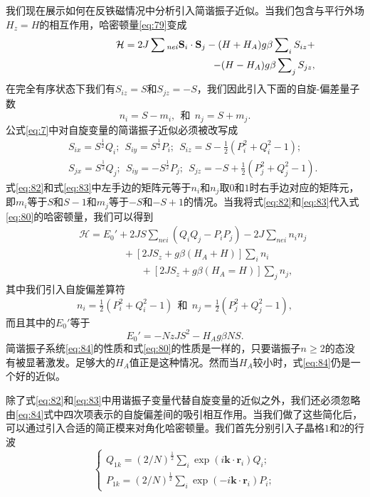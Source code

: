 \documentclass{article}
\begin{document}
我们现在展示如何在反铁磁情况中分析引入简谐振子近似。当我们包含与平行外场$H_z=H$的相互作用，哈密顿量\eqref{eq:79}变成
\begin{eqnarray} \label{eq:80}
&&\mathcal{H}=2J\sum\nolinebreak_{\mathit{nei}}\mathbf{S}_i\cdot\mathbf{S}_j-(H+H_A)g\beta\sum\nolimits_iS_{iz}+\nonumber\\
&&~~~~~~~~~~~~~~~~~~~~~~~~~~~~~~~~~~~~~~~~~~~~~-(H-H_A)g\beta\sum\nolimits_jS_{jz},
\end{eqnarray}
在完全有序状态下我们有$S_{iz}=S$和$S_{jz}=-S$，我们因此引入下面的自旋-偏差量子数
\begin{equation} \label{eq:81}
n_i=S-m_i,~~\text{和}~~n_j=S+m_j.
\end{equation} 
公式\eqref{eq:7}中对自旋变量的简谐振子近似必须被改写成
\begin{eqnarray} 
&&S_{ix}=S^{\frac{1}{2}}Q_i;~~S_{iy}=S^{\frac{1}{2}}P_i;~~S_{iz}=S-\tfrac{1}{2}(P_i^2+Q_i^2-1);\label{eq:82}\\
&&S_{jx}=S^{\frac{1}{2}}Q_j;~~S_{iy}=-S^{\frac{1}{2}}P_j;~~S_{jz}=-S+\tfrac{1}{2}(P_j^2+Q_j^2-1).\label{eq:83}
\end{eqnarray} 
式\eqref{eq:82}和式\eqref{eq:83}中左手边的矩阵元等于$n_i$和$n_j$取$0$和$1$时右手边对应的矩阵元，即$m_i$等于$S$和$S-1$和$m_j$等于$-S$和$-S+1$的情况。当我将式\eqref{eq:82}和\eqref{eq:83}代入式\eqref{eq:80}的哈密顿量，我们可以得到
\begin{eqnarray} \label{eq:84}
&&\mathcal{H}=E_0'+2JS\sum\nolimits_{\mathit{nei}}(Q_iQ_j-P_iP_j)-2J\sum\nolimits_{\mathit{nei}}n_in_j\nonumber\\
&&~~~~~~~~~~~~~~~~~~~~+[2JS_z+g\beta(H_A+H)]\sum\nolimits_in_i\nonumber\\
&&~~~~~~~~~~~~~~~~~~~~~~~~~~~~+[2JS_z+g\beta(H_A=H)]\sum\nolimits_jn_j,
\end{eqnarray}
其中我们引入自旋偏差算符
\begin{equation} \label{eq:85}
n_i=\tfrac{1}{2}(P_i^2+Q_i^2-1)~~\text{和}~~n_j=\tfrac{1}{2}(P_j^2+Q_j^2-1),
\end{equation}	
而且其中的$E_0'$等于
\begin{equation} \label{eq:86}
E_0'=-NzJS^2-H_Ag\beta NS.
\end{equation}
简谐振子系统\eqref{eq:84}的性质和式\eqref{eq:80}的性质是一样的，只要谐振子$n\geqslant 2$的态没有被显著激发。足够大的$H_A$值正是这种情况。然而当$H_A$较小时，式\eqref{eq:84}仍是一个好的近似。

除了式\eqref{eq:82}和\eqref{eq:83}中用谐振子变量代替自旋变量的近似之外，我们还必须忽略由\eqref{eq:84}式中四次项表示的自旋偏差间的吸引相互作用。当我们做了这些简化后，可以通过引入合适的简正模来对角化哈密顿量。我们首先分别引入子晶格$1$和$2$的行波
\begin{equation} \label{eq:87}
\left\{
\begin{array}{l}
Q_{1k}=(2/N)^{\frac{1}{2}}\sum\nolimits_i\exp(i\mathbf{k}\cdot\mathbf{r}_i)Q_i;\\
P_{1k}=(2/N)^{\frac{1}{2}}\sum\nolimits_i\exp(-i\mathbf{k}\cdot\mathbf{r}_i)P_i;
\end{array}
\right.
\end{equation}
\end{document}
